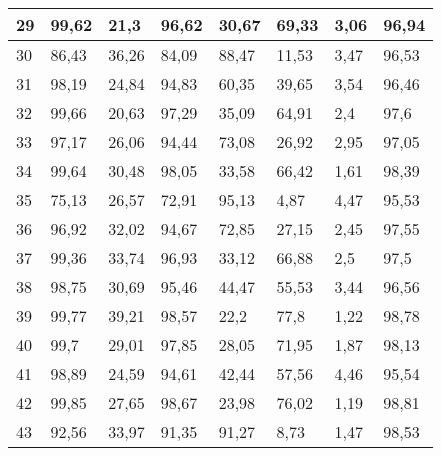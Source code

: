 \begin{longtable}[c]{|l|l|l|l|l|l|l|l|}
29              & 99,62        & 21,3         & 96,62       & 30,67         & 69,33         & 3,06          & 96,94         \\ \hline
30              & 86,43        & 36,26        & 84,09       & 88,47         & 11,53         & 3,47          & 96,53         \\ \hline
31              & 98,19        & 24,84        & 94,83       & 60,35         & 39,65         & 3,54          & 96,46         \\ \hline
32              & 99,66        & 20,63        & 97,29       & 35,09         & 64,91         & 2,4           & 97,6          \\ \hline
33              & 97,17        & 26,06        & 94,44       & 73,08         & 26,92         & 2,95          & 97,05         \\ \hline
34              & 99,64        & 30,48        & 98,05       & 33,58         & 66,42         & 1,61          & 98,39         \\ \hline
35              & 75,13        & 26,57        & 72,91       & 95,13         & 4,87          & 4,47          & 95,53         \\ \hline
36              & 96,92        & 32,02        & 94,67       & 72,85         & 27,15         & 2,45          & 97,55         \\ \hline
37              & 99,36        & 33,74        & 96,93       & 33,12         & 66,88         & 2,5           & 97,5          \\ \hline
38              & 98,75        & 30,69        & 95,46       & 44,47         & 55,53         & 3,44          & 96,56         \\ \hline
39              & 99,77        & 39,21        & 98,57       & 22,2          & 77,8          & 1,22          & 98,78         \\ \hline
40              & 99,7         & 29,01        & 97,85       & 28,05         & 71,95         & 1,87          & 98,13         \\ \hline
41              & 98,89        & 24,59        & 94,61       & 42,44         & 57,56         & 4,46          & 95,54         \\ \hline
42              & 99,85        & 27,65        & 98,67       & 23,98         & 76,02         & 1,19          & 98,81         \\ \hline
43              & 92,56        & 33,97        & 91,35       & 91,27         & 8,73          & 1,47          & 98,53         \\ \hline

\end{longtable}
